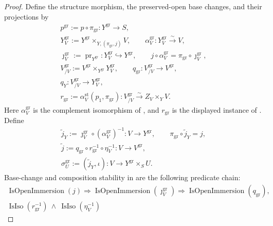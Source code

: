 \begin{proof}
  Define the structure morphism, the preserved-open base changes, and their
  projections by
  \[
  \begin{gathered}
    p^{\mathrm{gr}}:=p\circ\pi_{\mathrm{gr}}\colon
      Y^{\mathrm{gr}}\to S,\\
    Y^{\mathrm{gr}}_V:=Y^{\mathrm{gr}}\times_{Y,(\pi_{\mathrm{gr}},j)}V,
    \qquad
    \alpha_V^{\mathrm{gr}}\colon Y^{\mathrm{gr}}_V\xrightarrow{\sim}V,\\
    \jmath_V^{\mathrm{gr}}:=\operatorname{pr}_{Y^{\mathrm{gr}}}
      \colon Y^{\mathrm{gr}}_V\hookrightarrow Y^{\mathrm{gr}},
    \qquad
    j\circ\alpha_V^{\mathrm{gr}}
      =\pi_{\mathrm{gr}}\circ\jmath_V^{\mathrm{gr}},\\
    V^{\mathrm{gr}}_{/V}:=
      V^{\mathrm{gr}}\times_{Y^{\mathrm{gr}}}Y^{\mathrm{gr}}_V,
    \qquad
    q_{\mathrm{gr}}\colon V^{\mathrm{gr}}_{/V}\to V^{\mathrm{gr}},\\
    q_Y\colon V^{\mathrm{gr}}_{/V}\to Y^{\mathrm{gr}}_V,\\
    r_{\mathrm{gr}}:=
      \alpha_V^{\mathrm{st}}(p_1,\pi_{\mathrm{gr}})
      \colon V^{\mathrm{gr}}_{/V}\xrightarrow{\sim}Z_V\times_YV.
  \end{gathered} \tag{GE0}
  \]
  Here $\alpha_V^{\mathrm{gr}}$ is the complement isomorphism of
  , and $r_{\mathrm{gr}}$ is the displayed
  instance of .  Define
  \[
  \begin{gathered}
    \widetilde j_Y:=
      \jmath_V^{\mathrm{gr}}\circ(\alpha_V^{\mathrm{gr}})^{-1}
      \colon V\to Y^{\mathrm{gr}},
    \qquad
    \pi_{\mathrm{gr}}\circ\widetilde j_Y=j,\\
    \widetilde j:=q_{\mathrm{gr}}\circ r_{\mathrm{gr}}^{-1}
      \circ\eta_V^{-1}\colon V\to V^{\mathrm{gr}},\\
    \sigma_U^{\mathrm{gr}}:=(\widetilde j_Y,\iota)
      \colon V\to Y^{\mathrm{gr}}\times_SU.                       
  \end{gathered} \tag{GE0a}
  \]
  Base-change and composition stability in
   are the following predicate
  chain:
  \[
  \begin{gathered}
    \operatorname{IsOpenImmersion}(j)
      \Longrightarrow
      \operatorname{IsOpenImmersion}(\jmath_V^{\mathrm{gr}})
      \Longrightarrow\operatorname{IsOpenImmersion}(q_{\mathrm{gr}}),\\
    \operatorname{IsIso}(r_{\mathrm{gr}}^{-1})\ \wedge\
      \operatorname{IsIso}(\eta_V^{-1})

\end{gathered}\]
\end{proof}
